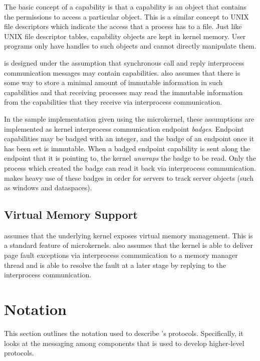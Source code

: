 The basic concept of a capability is that a capability is an object that contains the permissions to access a particular object. This is a similar concept to UNIX file descriptors which indicate the access that a process has to a file. Just like UNIX file descriptor tables, capability objects are kept in kernel memory. User programs only have handles to such objects and cannot directly manipulate them.

 is designed under the assumption that synchronous call and reply interprocess communication messages may contain capabilities.  also assumes that there is some way to store a minimal amount of immutable information in such capabilities and that receiving processes may read the immutable information from the capabilities that they receive via interprocess communication.

In the sample implementation given using the \seLf microkernel, these assumptions are implemented as kernel interprocess communication endpoint \emph{badges}. Endpoint capabilities may be badged with an integer, and the badge of an endpoint once it has been set is immutable. When a badged endpoint capability is sent along the endpoint that it is pointing to, the kernel \emph{unwraps} the badge to be read. Only the process which created the badge can read it back via interprocess communication.  makes heavy use of these badges in order for servers to track server objects (such as windows and dataspaces).

\subsection{Virtual Memory Support}

 assumes that the underlying kernel exposes virtual memory management. This is a standard feature of microkernels.  also assumes that the kernel is able to deliver page fault exceptions via interprocess communication to a memory manager thread and is able to resolve the fault at a later stage by replying to the interprocess communication.

\section{Notation}

This section outlines the notation used to describe 's protocols. Specifically, it looks at the messaging among components that is used to develop higher-level protocols. 

